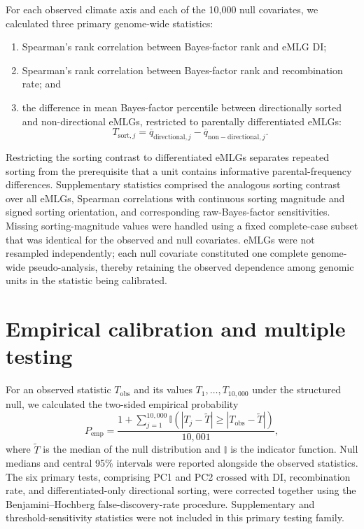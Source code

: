 \documentclass[11pt,a4paper]{article}
\begin{document}
For each observed climate axis and each of the 10,000 null covariates, we calculated three primary genome-wide statistics:
\begin{enumerate}
  \item Spearman's rank correlation between Bayes-factor rank and eMLG DI;
  \item Spearman's rank correlation between Bayes-factor rank and recombination rate; and
  \item the difference in mean Bayes-factor percentile between directionally sorted and non-directional eMLGs, restricted to parentally differentiated eMLGs:
  \begin{equation}
    T_{\mathrm{sort},j}=
    \overline{q}_{\mathrm{directional},j}
    -\overline{q}_{\mathrm{non-directional},j}.
  \end{equation}
\end{enumerate}

Restricting the sorting contrast to differentiated eMLGs separates repeated sorting from the prerequisite that a unit contains informative parental-frequency differences. Supplementary statistics comprised the analogous sorting contrast over all eMLGs, Spearman correlations with continuous sorting magnitude and signed sorting orientation, and corresponding raw-Bayes-factor sensitivities. Missing sorting-magnitude values were handled using a fixed complete-case subset that was identical for the observed and null covariates. eMLGs were not resampled independently; each null covariate constituted one complete genome-wide pseudo-analysis, thereby retaining the observed dependence among genomic units in the statistic being calibrated.

\section{Empirical calibration and multiple testing}

For an observed statistic $T_{\mathrm{obs}}$ and its values $T_1,\ldots,T_{10{,}000}$ under the structured null, we calculated the two-sided empirical probability
\begin{equation}
  P_{\mathrm{emp}}=
  \frac{1+\sum_{j=1}^{10{,}000}
  \mathbb{I}\!\left(
  \left|T_j-\widetilde{T}\right|
  \geq
  \left|T_{\mathrm{obs}}-\widetilde{T}\right|
  \right)}{10{,}001},
\end{equation}
where $\widetilde{T}$ is the median of the null distribution and $\mathbb{I}$ is the indicator function. Null medians and central 95\% intervals were reported alongside the observed statistics. The six primary tests, comprising PC1 and PC2 crossed with DI, recombination rate, and differentiated-only directional sorting, were corrected together using the Benjamini--Hochberg false-discovery-rate procedure. Supplementary and threshold-sensitivity statistics were not included in this primary testing family.
\end{document}

